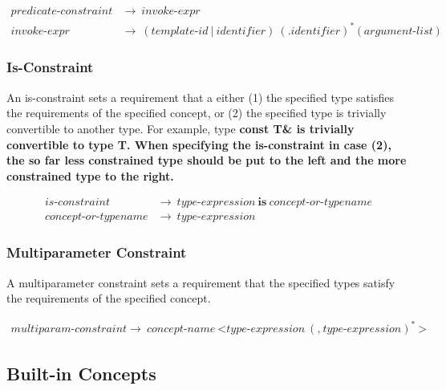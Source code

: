 \documentclass[a4paper,oneside,11pt]{article}
\begin{document}
\begin{align*}
predicate\textrm{-}constraint &\rightarrow \> invoke\textrm{-}expr\\
invoke\textrm{-}expr &\rightarrow \> ( \hyperref[templateid]{template\textrm{-}id} \> | \> \hyperref[identifier]{identifier} ) \>
( \texttt{.} \hyperref[identifier]{identifier} )^* \> \texttt{(} \> \hyperref[argumentlist]{argument\textrm{-}list} \> \texttt{)}
\end{align*}

\subsubsection{Is-Constraint}\label{isconstraint}

An is-constraint sets a requirement that a either (1) the specified type satisfies the requirements of the specified concept, or (2) the specified type is trivially convertible to another type. For example, type \bf{const T\&} is trivially convertible to type \bf{T}.
When specifying the is-constraint in case (2), the so far less constrained type should be put to the left and the more constrained type to the right.

\begin{align*}
is\textrm{-}constraint &\rightarrow \> \hyperref[typeexpr]{type\textrm{-}expression} \> \textbf{is} \> concept\textrm{-}or\textrm{-}typename\\
concept\textrm{-}or\textrm{-}typename &\rightarrow \> \hyperref[typeexpr]{type\textrm{-}expression}
\end{align*}

\subsubsection{Multiparameter Constraint}\label{multiparamconstraint}

A multiparameter constraint sets a requirement that the specified types satisfy the requirements of the specified concept.

\begin{align*}
multiparam\textrm{-}constraint \rightarrow \> \hyperref[conceptname]{concept\textrm{-}name} \> \texttt{<} \hyperref[typeexpr]{type\textrm{-}expression} \>
(\texttt{,} \> \hyperref[typeexpr]{type\textrm{-}expression})^* \> \texttt{>}
\end{align*}

\subsection{Built-in Concepts}
\end{document}
